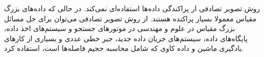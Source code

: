 روش تصویر تصادفی ار پراکندگی داده‌ها استفاده‌ای نمی‌کند. در حالی که داده‌های بزرگ مقیاس معمولا بسیار پراکنده هستند. از روش تصویر تصادفی می‌توان برای حل مسائل بزرگ مقیاس در علوم و مهندسی در موتورهای جستجو و سیستم‌های اخذ داده، پایگاه‌های داده، سیستم‌های جریان داده جدید، جبر خطی عددی و بسیاری از کارهای یادگیری ماشین و داده کاوی که شامل محاسبه حجیم فاصله‌ها است، استفاده کرد.






